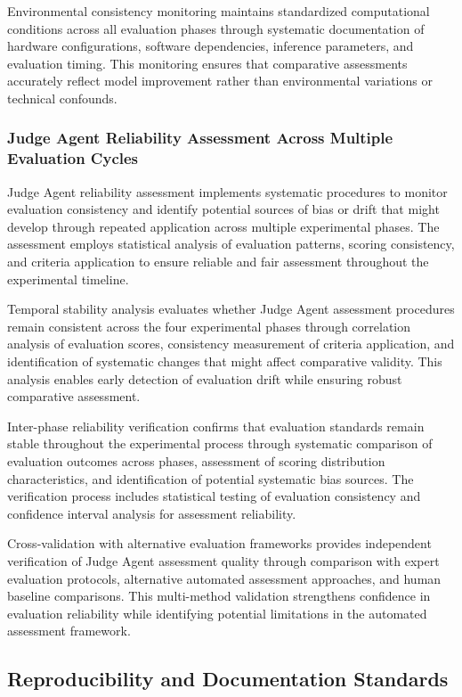 Environmental consistency monitoring maintains standardized computational conditions across all evaluation phases through systematic documentation of hardware configurations, software dependencies, inference parameters, and evaluation timing. This monitoring ensures that comparative assessments accurately reflect model improvement rather than environmental variations or technical confounds.

\subsubsection{Judge Agent Reliability Assessment Across Multiple Evaluation Cycles}

Judge Agent reliability assessment implements systematic procedures to monitor evaluation consistency and identify potential sources of bias or drift that might develop through repeated application across multiple experimental phases. The assessment employs statistical analysis of evaluation patterns, scoring consistency, and criteria application to ensure reliable and fair assessment throughout the experimental timeline.

Temporal stability analysis evaluates whether Judge Agent assessment procedures remain consistent across the four experimental phases through correlation analysis of evaluation scores, consistency measurement of criteria application, and identification of systematic changes that might affect comparative validity. This analysis enables early detection of evaluation drift while ensuring robust comparative assessment.

Inter-phase reliability verification confirms that evaluation standards remain stable throughout the experimental process through systematic comparison of evaluation outcomes across phases, assessment of scoring distribution characteristics, and identification of potential systematic bias sources. The verification process includes statistical testing of evaluation consistency and confidence interval analysis for assessment reliability.

Cross-validation with alternative evaluation frameworks provides independent verification of Judge Agent assessment quality through comparison with expert evaluation protocols, alternative automated assessment approaches, and human baseline comparisons. This multi-method validation strengthens confidence in evaluation reliability while identifying potential limitations in the automated assessment framework.

\subsection{Reproducibility and Documentation Standards}


